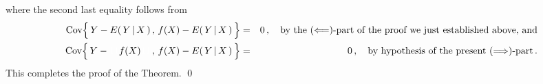 where the second last equality follows from
\begin{eqnarray*}
\Cov\!\left\{\,
	Y \overset{{\color{white}.}}{-} E(\,Y\,\vert\,X\,)
	\,,\,
	f(X) \overset{{\color{white}.}}{-} E(\,Y\,\vert\,X\,)
	\,\right\}
&=& 0\,,
\quad\textnormal{by the $(\Longleftarrow)$-part of the proof we just established above, and}
\\
\Cov\!\left\{\,
	Y \overset{{\color{white}.}}{-} {\color{white}11} f(X) {\color{white}11}
	\,,\,
	f(X) \overset{{\color{white}.}}{-} E(\,Y\,\vert\,X\,)
	\,\right\}
&=& 0\,,
\quad\textnormal{by hypothesis of the present $(\Longrightarrow)$-part}\,.
\end{eqnarray*}
This completes the proof of the Theorem.
\qed


\renewcommand{\theenumi}{\roman{enumi}}
\renewcommand{\labelenumi}{\textnormal{(\theenumi)}$\;\;$}

